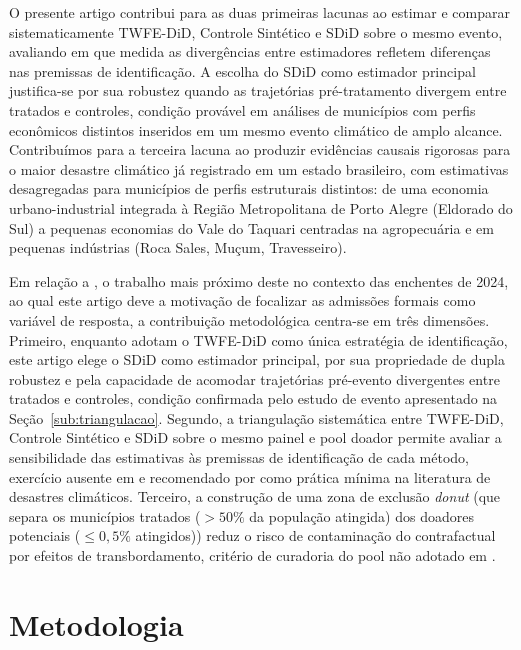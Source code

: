 \documentclass[a4paper,12pt]{article}
\begin{document}
O presente artigo contribui para as duas primeiras lacunas ao estimar e comparar
sistematicamente TWFE-DiD, Controle Sintético e SDiD sobre o mesmo evento, avaliando
em que medida as divergências entre estimadores refletem diferenças nas premissas de
identificação. A escolha do SDiD como estimador principal justifica-se por sua robustez
quando as trajetórias pré-tratamento divergem entre tratados e controles, condição
provável em análises de municípios com perfis econômicos distintos inseridos em um
mesmo evento climático de amplo alcance. Contribuímos para a terceira lacuna ao produzir
evidências causais rigorosas para o maior desastre climático já registrado em um estado
brasileiro, com estimativas desagregadas para municípios de perfis estruturais distintos:
de uma economia urbano-industrial integrada à Região Metropolitana de Porto Alegre
(Eldorado do Sul) a pequenas economias do Vale do Taquari centradas na agropecuária e
em pequenas indústrias (Roca Sales, Muçum, Travesseiro).

Em relação a , o trabalho mais próximo deste no contexto
das enchentes de 2024, ao qual este artigo deve a motivação de focalizar as admissões
formais como variável de resposta, a contribuição metodológica centra-se em três
dimensões. Primeiro, enquanto  adotam o TWFE-DiD como
única estratégia de identificação, este artigo elege o SDiD como estimador principal,
por sua propriedade de dupla robustez e pela capacidade de acomodar trajetórias
pré-evento divergentes entre tratados e controles, condição confirmada pelo estudo
de evento apresentado na Seção~\ref{sub:triangulacao}. Segundo, a triangulação
sistemática entre TWFE-DiD, Controle Sintético e SDiD sobre o mesmo painel e pool
doador permite avaliar a sensibilidade das estimativas às premissas de identificação
de cada método, exercício ausente em  e recomendado por
 como prática mínima na literatura de desastres climáticos.
Terceiro, a construção de uma zona de exclusão \textit{donut} (que separa os
municípios tratados ($>50\%$ da população atingida) dos doadores potenciais
($\leq 0{,}5\%$ atingidos)) reduz o risco de contaminação do contrafactual por
efeitos de transbordamento, critério de curadoria do pool não adotado em
.


\section{Metodologia}
\label{sec:metodologia}
\end{document}
